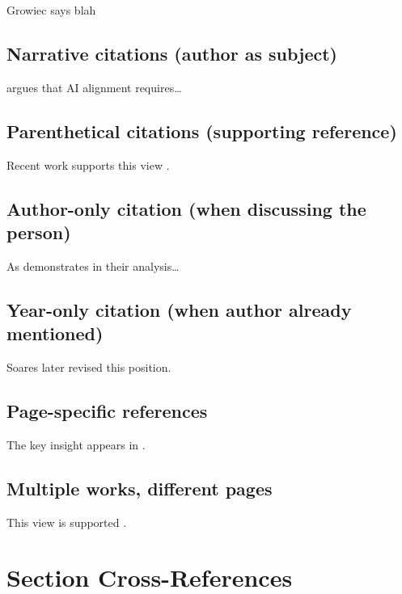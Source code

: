 \documentclass[
  11pt,
  letterpaper,
]{book}
\begin{document}
Growiec says blah \autocite*{growiec2024}

\subsection{Narrative citations (author as
subject)}\label{narrative-citations-author-as-subject-1}

\textcite{soares2014} argues that AI alignment requires\ldots{}

\subsection{Parenthetical citations (supporting
reference)}\label{parenthetical-citations-supporting-reference-1}

Recent work supports this view \autocite{soares2014,knuth1984}.

\subsection{Author-only citation (when discussing the
person)}\label{author-only-citation-when-discussing-the-person-1}

As \autocite*{soares2014} demonstrates in their analysis\ldots{}

\subsection{Year-only citation (when author already
mentioned)}\label{year-only-citation-when-author-already-mentioned-1}

Soares \autocite*{soares2014} later revised this position.

\subsection{Page-specific references}\label{page-specific-references-1}

The key insight appears in \autocite[45-67]{soares2014}.

\subsection{Multiple works, different
pages}\label{multiple-works-different-pages-1}

This view is supported \autocites[23]{soares2014}[156-159]{knuth1984}.

\section{Section Cross-References}\label{sec-crossref}
\end{document}
